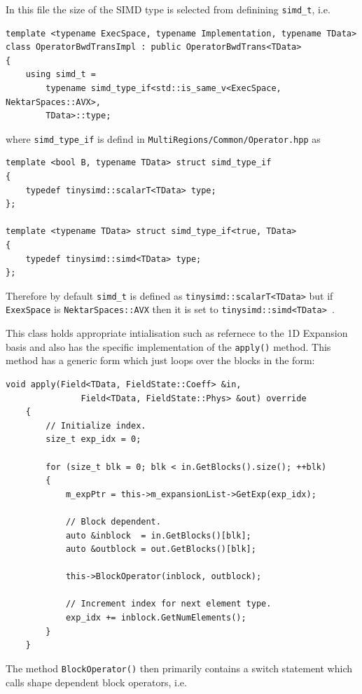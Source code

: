 In this file the size of the SIMD type is selected from definining \texttt{simd\_t}, i.e.

\begin{lstlisting}[style=C++Style]
template <typename ExecSpace, typename Implementation, typename TData>
class OperatorBwdTransImpl : public OperatorBwdTrans<TData>
{
    using simd_t =
        typename simd_type_if<std::is_same_v<ExecSpace, NektarSpaces::AVX>,
        TData>::type;
\end{lstlisting}

where \texttt{simd\_type\_if} is defind in \texttt{MultiRegions/Common/Operator.hpp} as 


\begin{lstlisting}[style=C++Style]
template <bool B, typename TData> struct simd_type_if
{
    typedef tinysimd::scalarT<TData> type;
};

template <typename TData> struct simd_type_if<true, TData>
{
    typedef tinysimd::simd<TData> type;
};
\end{lstlisting}

Therefore by default \texttt{simd\_t} is defined as
\texttt{tinysimd::scalarT<TData>} but if \texttt{ExexSpace} is
\texttt{NektarSpaces::AVX} then it is set to
\texttt{tinysimd::simd<TData> }.

This class holds appropriate intialisation such as refernece to the 1D
Expansion basis and also has the specific implementation of the
\texttt{apply()} method. This method has a generic form which just
loops over the blocks in the form:

\begin{lstlisting}[style=C++Style]
    void apply(Field<TData, FieldState::Coeff> &in,
               Field<TData, FieldState::Phys> &out) override
    {
        // Initialize index.
        size_t exp_idx = 0;

        for (size_t blk = 0; blk < in.GetBlocks().size(); ++blk)
        {
            m_expPtr = this->m_expansionList->GetExp(exp_idx);

            // Block dependent.
            auto &inblock  = in.GetBlocks()[blk];
            auto &outblock = out.GetBlocks()[blk];

            this->BlockOperator(inblock, outblock);

            // Increment index for next element type.
            exp_idx += inblock.GetNumElements();
        }
    }
\end{lstlisting}

The method \texttt{BlockOperator()} then primarily contains a switch statement which calls shape dependent block operators, i.e.

